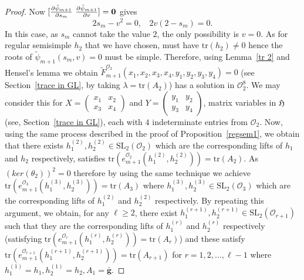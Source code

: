 \documentclass[10pt,twoside]{amsart}
\newcommand{\SL}{\mathrm{SL}}
\newcommand{\tr}{\mathrm{tr}}
\newcommand{\R}{\mathcal{O}_2}
\theoremstyle{definition}
\theoremstyle{definition}
\begin{document}
\begin{proof}
Now $[\frac{\partial \Tilde{\psi}_{m+1}}{\partial s_m}\ \frac{\partial \Tilde{\psi}_{m+1}}{\partial v}]=\mathbf{0}$ gives
\begin{equation}
2s_m-v^2=0, \ \ \ \ 2v(2-s_m)=0.
\end{equation}
In this case, as $s_m$ cannot take the value $2$, the only possibility is $v=0$. As for regular semisimple $h_2$ that we have chosen, must have $\tr(h_2)\neq 0$ hence the roots of $\tilde{\psi}_{m+1}(s_m, v) = 0$ must be simple. Therefore, using Lemma~\ref{tr 2} and Hensel's lemma we obtain $\widetilde F_{m+1}^{\R}(x_1, x_2, x_3, x_4, y_1, y_2, y_3, y_4) = 0$ (see Section~\ref{trace in GL}, by taking $\lambda = \tr(A_2)$) has a solution in $\mathcal{O}_2^8$. We may consider this for $X = \left (\begin{array}{cc} x_1& x_2 \\ x_3 & x_4 \end{array}\right )$ and $Y = \left (\begin{array}{cc} y_1 & y_2  \\ y_3 & y_4 \end{array}\right )$, matrix variables in $\mathfrak{H}$ (see, Section~\ref{trace in GL}), each with $4$ indeterminate entries from $\R$. Now, using the same process described in the proof of Proposition~\ref{regsem1}, we obtain that there exists $h_1^{(2)}, h_2^{(2)}\in \SL_2(\mathcal{O}_2)$ which are the corresponding lifts of $h_1$ and $h_2$ respectively, satisfies $\tr(e_{m+1}^{\R}(h_1^{(2)}, h_2^{(2)})) = \tr(A_2)$. As $(ker (\theta_2))^2 = 0$ therefore by using the same technique we achieve $\tr(e_{m+1}^{\mathcal{O}_3}(h_1^{(3)}, h_2^{(3)})) = \tr(A_3)$ where  $h_1^{(3)}, h_2^{(3)} \in \SL_2(\mathcal{O}_3)$ which are the corresponding lifts of $h_1^{(2)}$ and $h_2^{(2)}$ respectively. By repeating this argument, we obtain, for any $\ell \geq 2$, there exist $h_1^{(r+1)}, h_2^{(r+1)}\in \SL_2(\mathcal{O}_{r+1})$ such that they are the corresponding lifts of $h_1^{(r)}$ and $h_2^{(r)}$ respectively (satisfying $\tr(e_{m+1}^{\mathcal{O}_r}(h_1^{(r)}, h_2^{(r)})) = \tr(A_{r})$) and these satisfy $\tr(e_{m+1}^{\mathcal{O}_{r+1}}(h_1^{(r+1)}, h_2^{(r+1)})) = \tr(A_{r+1})$ for $r=1, 2, \ldots, \ell-1$ where $h_1^{(1)} = h_1, h_2^{(1)} = h_2, A_1 = \mathbf{\bar g}$. 


\end{proof}
\end{document}
